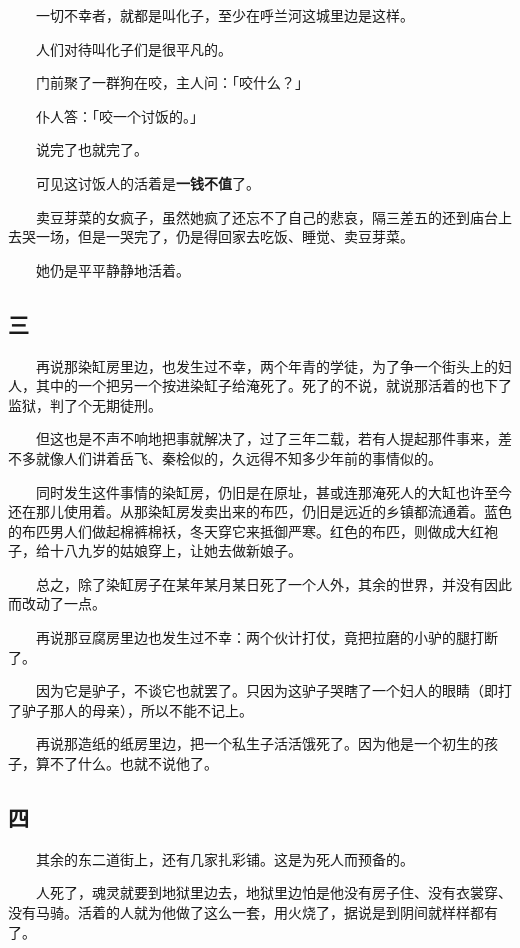 \documentclass[UTF8]{ctexart}
\begin{document}
　　一切不幸者，就都是叫化子，至少在呼兰河这城里边是这样。

　　人们对待叫化子们是很平凡的。

　　门前聚了一群狗在咬，主人问：「咬什么？」

　　仆人答：「咬一个讨饭的。」

　　说完了也就完了。

　　可见这讨饭人的活着是\textbf{一钱不值}了。

　　卖豆芽菜的女疯子，虽然她疯了还忘不了自己的悲哀，隔三差五的还到庙台上去哭一场，但是一哭完了，仍是得回家去吃饭、睡觉、卖豆芽菜。

　　她仍是平平静静地活着。

\subsection{三}

　　再说那染缸房里边，也发生过不幸，两个年青的学徒，为了争一个街头上的妇人，其中的一个把另一个按进染缸子给淹死了。死了的不说，就说那活着的也下了监狱，判了个无期徒刑。

　　但这也是不声不响地把事就解决了，过了三年二载，若有人提起那件事来，差不多就像人们讲着岳飞、秦桧似的，久远得不知多少年前的事情似的。

　　同时发生这件事情的染缸房，仍旧是在原址，甚或连那淹死人的大缸也许至今还在那儿使用着。从那染缸房发卖出来的布匹，仍旧是远近的乡镇都流通着。蓝色的布匹男人们做起棉裤棉袄，冬天穿它来抵御严寒。红色的布匹，则做成大红袍子，给十八九岁的姑娘穿上，让她去做新娘子。

　　总之，除了染缸房子在某年某月某日死了一个人外，其余的世界，并没有因此而改动了一点。

　　再说那豆腐房里边也发生过不幸：两个伙计打仗，竟把拉磨的小驴的腿打断了。

　　因为它是驴子，不谈它也就罢了。只因为这驴子哭瞎了一个妇人的眼睛（即打了驴子那人的母亲），所以不能不记上。

　　再说那造纸的纸房里边，把一个私生子活活饿死了。因为他是一个初生的孩子，算不了什么。也就不说他了。

\subsection{四}

　　其余的东二道街上，还有几家扎彩铺。这是为死人而预备的。

　　人死了，魂灵就要到地狱里边去，地狱里边怕是他没有房子住、没有衣裳穿、没有马骑。活着的人就为他做了这么一套，用火烧了，据说是到阴间就样样都有了。
\end{document}

